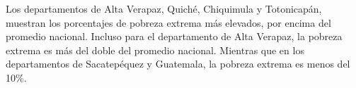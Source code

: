 Los departamentos de Alta Verapaz, Quiché, Chiquimula y Totonicapán, muestran los porcentajes de pobreza extrema más elevados, por encima del promedio nacional. Incluso para el departamento de Alta Verapaz, la pobreza extrema es más del doble del promedio nacional. Mientras que en los departamentos de Sacatepéquez y Guatemala, la pobreza extrema es menos del 10\%.